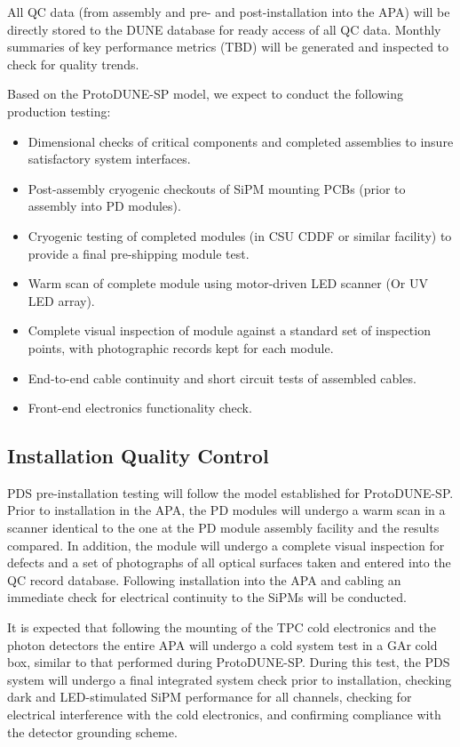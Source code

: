 All QC data  (from assembly and pre- and post-installation into the APA) will be directly stored to the DUNE database for ready access of all QC data.  Monthly summaries of key performance metrics (TBD) will be generated and inspected to check for quality trends.

Based on the ProtoDUNE-SP model, we expect to conduct the following production testing:
\begin{itemize}
\item Dimensional checks of critical components and completed assemblies to insure satisfactory system interfaces.
\item Post-assembly cryogenic checkouts of SiPM mounting PCBs (prior to assembly into PD modules).
\item Cryogenic testing of completed modules (in CSU CDDF or similar facility) to provide a final pre-shipping module test.
\item Warm scan of complete module using motor-driven LED scanner (Or UV LED array).
\item Complete visual inspection of module against a standard set of inspection points, with photographic records kept for each module.
\item End-to-end cable continuity and short circuit tests of assembled cables.
\item Front-end electronics functionality check.
\end{itemize}

\subsection{Installation Quality Control}
\label{sec:fdsp-pd-prodqc}

PDS pre-installation testing will follow the model established for ProtoDUNE-SP.  Prior to installation in the APA, the PD modules will undergo a warm scan in a scanner identical to the one at the PD module assembly facility and the results compared.  In addition, the module will undergo a complete visual inspection for defects and a set of photographs of all optical surfaces taken and entered into the QC record database.  Following installation into the APA and cabling an immediate check for electrical continuity to the SiPMs will be conducted.

It is expected that following the mounting of the TPC cold electronics and the photon detectors the entire APA will undergo a cold system test in a GAr cold box, similar to that performed during ProtoDUNE-SP.  During this test, the PDS system will undergo a final integrated system check prior to installation, checking dark and LED-stimulated SiPM performance for all channels, checking for electrical interference with the cold electronics, and confirming compliance with the detector grounding scheme.
